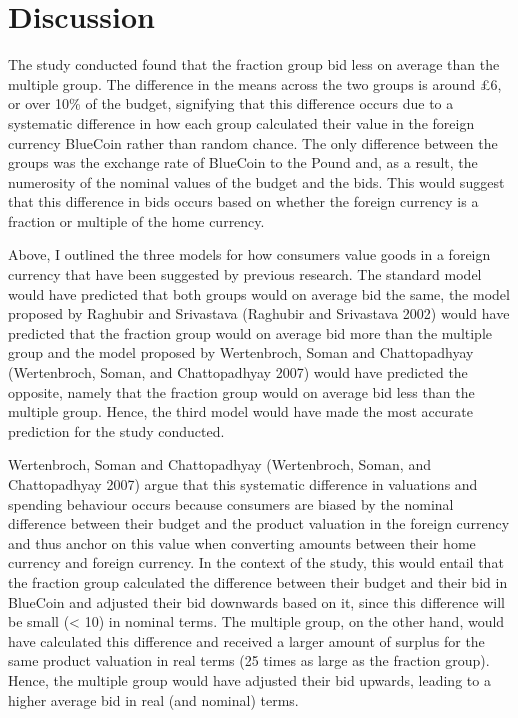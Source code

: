 \documentclass[
]{report}
\begin{document}
\chapter{Discussion}\label{discussion}

The study conducted found that the fraction group bid less on average
than the multiple group. The difference in the means across the two
groups is around £6, or over 10\% of the budget, signifying that this
difference occurs due to a systematic difference in how each group
calculated their value in the foreign currency BlueCoin rather than
random chance. The only difference between the groups was the exchange
rate of BlueCoin to the Pound and, as a result, the numerosity of the
nominal values of the budget and the bids. This would suggest that this
difference in bids occurs based on whether the foreign currency is a
fraction or multiple of the home currency.

Above, I outlined the three models for how consumers value goods in a
foreign currency that have been suggested by previous research. The
standard model would have predicted that both groups would on average
bid the same, the model proposed by Raghubir and Srivastava (Raghubir
and Srivastava 2002) would have predicted that the fraction group would
on average bid more than the multiple group and the model proposed by
Wertenbroch, Soman and Chattopadhyay (Wertenbroch, Soman, and
Chattopadhyay 2007) would have predicted the opposite, namely that the
fraction group would on average bid less than the multiple group. Hence,
the third model would have made the most accurate prediction for the
study conducted.

Wertenbroch, Soman and Chattopadhyay (Wertenbroch, Soman, and
Chattopadhyay 2007) argue that this systematic difference in valuations
and spending behaviour occurs because consumers are biased by the
nominal difference between their budget and the product valuation in the
foreign currency and thus anchor on this value when converting amounts
between their home currency and foreign currency. In the context of the
study, this would entail that the fraction group calculated the
difference between their budget and their bid in BlueCoin and adjusted
their bid downwards based on it, since this difference will be small
(\textless{} 10) in nominal terms. The multiple group, on the other
hand, would have calculated this difference and received a larger amount
of surplus for the same product valuation in real terms (25 times as
large as the fraction group). Hence, the multiple group would have
adjusted their bid upwards, leading to a higher average bid in real (and
nominal) terms.
\end{document}
